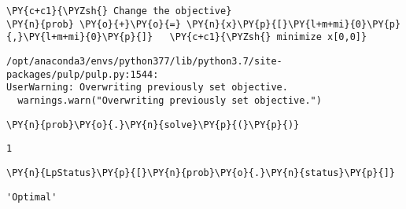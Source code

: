     \begin{tcolorbox}[breakable, size=fbox, boxrule=1pt, pad at break*=1mm,colback=cellbackground, colframe=cellborder]
\begin{Verbatim}[commandchars=\\\{\}]
\PY{c+c1}{\PYZsh{} Change the objective}
\PY{n}{prob} \PY{o}{+}\PY{o}{=} \PY{n}{x}\PY{p}{[}\PY{l+m+mi}{0}\PY{p}{,}\PY{l+m+mi}{0}\PY{p}{]}   \PY{c+c1}{\PYZsh{} minimize x[0,0]}
\end{Verbatim}
\end{tcolorbox}

    \begin{Verbatim}[commandchars=\\\{\}]
/opt/anaconda3/envs/python377/lib/python3.7/site-packages/pulp/pulp.py:1544:
UserWarning: Overwriting previously set objective.
  warnings.warn("Overwriting previously set objective.")
    \end{Verbatim}

    \begin{tcolorbox}[breakable, size=fbox, boxrule=1pt, pad at break*=1mm,colback=cellbackground, colframe=cellborder]
\begin{Verbatim}[commandchars=\\\{\}]
\PY{n}{prob}\PY{o}{.}\PY{n}{solve}\PY{p}{(}\PY{p}{)}
\end{Verbatim}
\end{tcolorbox}

            \begin{tcolorbox}[breakable, size=fbox, boxrule=.5pt, pad at break*=1mm, opacityfill=0]
\begin{Verbatim}[commandchars=\\\{\}]
1
\end{Verbatim}
\end{tcolorbox}
        
    \begin{tcolorbox}[breakable, size=fbox, boxrule=1pt, pad at break*=1mm,colback=cellbackground, colframe=cellborder]
\begin{Verbatim}[commandchars=\\\{\}]
\PY{n}{LpStatus}\PY{p}{[}\PY{n}{prob}\PY{o}{.}\PY{n}{status}\PY{p}{]}
\end{Verbatim}
\end{tcolorbox}

            \begin{tcolorbox}[breakable, size=fbox, boxrule=.5pt, pad at break*=1mm, opacityfill=0]
\begin{Verbatim}[commandchars=\\\{\}]
'Optimal'
\end{Verbatim}
\end{tcolorbox}
        

